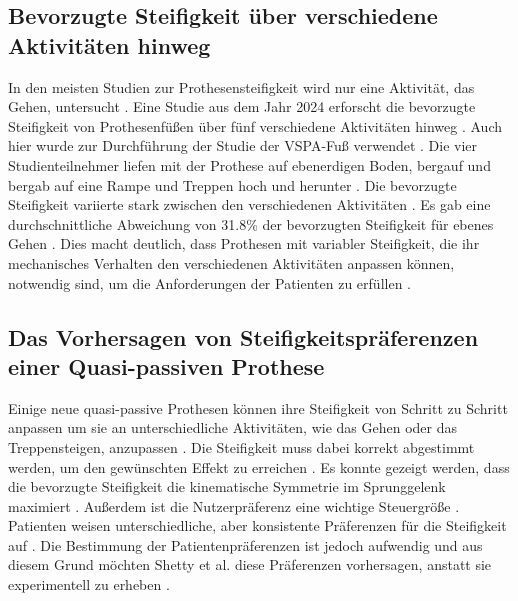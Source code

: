 \subsection{Bevorzugte Steifigkeit über verschiedene Aktivitäten hinweg}
In den meisten Studien zur Prothesensteifigkeit wird nur eine Aktivität, das Gehen, untersucht \cite{InstituteofElectricalandElectronicsEngineers.2024}. Eine Studie aus dem Jahr 2024 erforscht die bevorzugte Steifigkeit von Prothesenfüßen über fünf verschiedene Aktivitäten hinweg \cite{InstituteofElectricalandElectronicsEngineers.2024}. Auch hier wurde zur Durchführung der Studie der VSPA-Fuß verwendet \cite{InstituteofElectricalandElectronicsEngineers.2024}. Die vier Studienteilnehmer liefen mit der Prothese auf ebenerdigen Boden, bergauf und bergab auf eine Rampe und Treppen hoch und herunter \cite{InstituteofElectricalandElectronicsEngineers.2024}. Die bevorzugte Steifigkeit variierte stark zwischen den verschiedenen Aktivitäten \cite{InstituteofElectricalandElectronicsEngineers.2024}. Es gab eine durchschnittliche Abweichung von 31.8\% der bevorzugten Steifigkeit für ebenes Gehen \cite{InstituteofElectricalandElectronicsEngineers.2024}. Dies macht deutlich, dass Prothesen mit variabler Steifigkeit, die ihr mechanisches Verhalten den verschiedenen Aktivitäten anpassen können, notwendig sind, um die Anforderungen der Patienten zu erfüllen \cite{InstituteofElectricalandElectronicsEngineers.2024}.

\subsection{Das Vorhersagen von Steifigkeitspräferenzen einer Quasi-passiven Prothese}
Einige neue quasi-passive Prothesen können ihre Steifigkeit von Schritt zu Schritt anpassen um sie an unterschiedliche Aktivitäten, wie das Gehen oder das Treppensteigen, anzupassen \cite{Shetty.2022}. Die Steifigkeit muss dabei korrekt abgestimmt werden, um den gewünschten Effekt zu erreichen \cite{Shetty.2022}. Es konnte gezeigt werden, dass die bevorzugte Steifigkeit die kinematische Symmetrie im Sprunggelenk maximiert \cite{Shetty.2022}. Außerdem ist die Nutzerpräferenz eine wichtige Steuergröße \cite{Shetty.2022}. Patienten weisen unterschiedliche, aber konsistente Präferenzen für die Steifigkeit auf \cite{Shetty.2022}. Die Bestimmung der Patientenpräferenzen ist jedoch aufwendig und aus diesem Grund möchten Shetty et al. diese Präferenzen vorhersagen, anstatt sie experimentell zu erheben \cite{Shetty.2022}.

